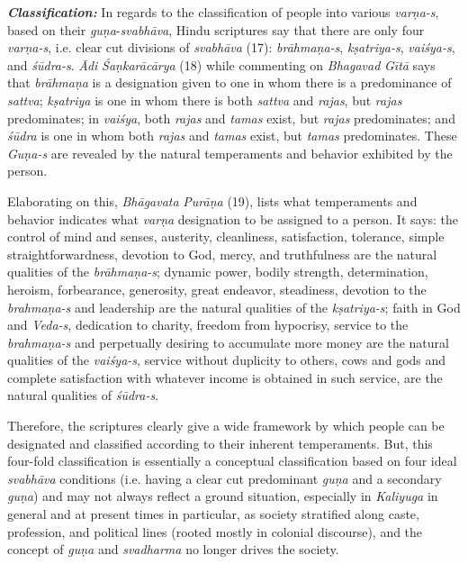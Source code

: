 \emph{\textbf{Classification:}} In regards to the classification of people into various \emph{varṇa-s}, based on their \emph{guṇa}-\emph{svabhāva}, Hindu scriptures say that there are only four \emph{varṇa-s}, i.e. clear cut divisions of \emph{svabhāva} (17): \emph{brāhmaṇa-s}, \emph{kṣatriya-s}, \emph{vaiśya-s}, and \emph{śūdra-s}. \emph{Ādi} \emph{Śaṇkarācārya} (18) while commenting on \emph{Bhagavad} \emph{Gītā} says that \emph{brāhmaṇa} is a designation given to one in whom there is a predominance of \emph{sattva}; \emph{kṣatriya} is one in whom there is both \emph{sattva} and \emph{rajas}, but \emph{rajas} predominates; in \emph{vaiśya}, both \emph{rajas} and \emph{tamas} exist, but \emph{rajas} predominates; and \emph{śūdra} is one in whom both \emph{rajas} and \emph{tamas} exist, but \emph{tamas} predominates. These \emph{Guṇa-s} are revealed by the natural temperaments and behavior exhibited by the person.

Elaborating on this, \emph{Bhāgavata} \emph{Purāṇa} (19), lists what temperaments and behavior indicates what \emph{varṇa} designation to be assigned to a person. It says: the control of mind and senses, austerity, cleanliness, satisfaction, tolerance, simple straightforwardness, devotion to God, mercy, and truthfulness are the natural qualities of the \emph{brāhmaṇa-s}; dynamic power, bodily strength, determination, heroism, forbearance, generosity, great endeavor, steadiness, devotion to the \emph{brahmaṇa-s} and leadership are the natural qualities of the \emph{kṣatriya-s}; faith in God and \emph{Veda-s}, dedication to charity, freedom from hypocrisy, service to the \emph{brahmaṇa-s} and perpetually desiring to accumulate more money are the natural qualities of the \emph{vaiśya-s}, service without duplicity to others, cows and gods and complete satisfaction with whatever income is obtained in such service, are the natural qualities of \emph{śūdra-s}.

Therefore, the scriptures clearly give a wide framework by which people can be designated and classified according to their inherent temperaments. But, this four-fold classification is essentially a conceptual classification based on four ideal \emph{svabhāva} conditions (i.e. having a clear cut predominant \emph{guṇa} and a secondary \emph{guṇa}) and may not always reflect a ground situation, especially in \emph{Kaliyuga} in general and at present times in particular, as society stratified along caste, profession, and political lines (rooted mostly in colonial discourse), and the concept of \emph{guṇa} and \emph{svadharma} no longer drives the society.

